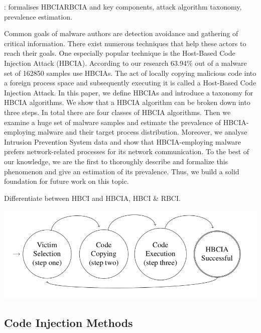 \documentclass{article}
\begin{document}
\textbf{}: \textcite{Barabosch:2014}  formalises HBCIA\/RBCIA and key components, attack algorithm taxonomy, prevalence estimation.

Common goals of malware authors are detection avoidance and gathering of critical information. There exist numerous techniques that help these actors to reach their goals. One especially popular technique is the Host-Based Code Injection Attack (HBCIA). According to our research 63.94\% out of a malware set of 162850 samples use HBCIAs. The act of locally copying malicious code into a foreign process space and subsequently executing it is called a Host-Based Code Injection Attack. In this paper, we define HBCIAs and introduce a taxonomy for HBCIA algorithms. We show that a HBCIA algorithm can be broken down into three steps. In total there are four classes of HBCIA algorithms. Then we examine a huge set of malware samples and estimate the prevalence of HBCIA-employing malware and their target process distribution. Moreover, we analyse Intrusion Prevention System data and show that HBCIA-employing malware prefers network-related processes for its network communication. To the best of our knowledge, we are the first to thoroughly describe and formalize this phenomenon and give an estimation of its prevalence. Thus, we build a solid foundation for future work on this topic.

Differentiate between HBCI and HBCIA, HBCI \& RBCI.

\includegraphics[scale=0.4]{hbcia_3step_algo.png}

\subsection{Code Injection Methods}


\subsubsection{}
\textcite{Mitre:2017}
\end{document}
